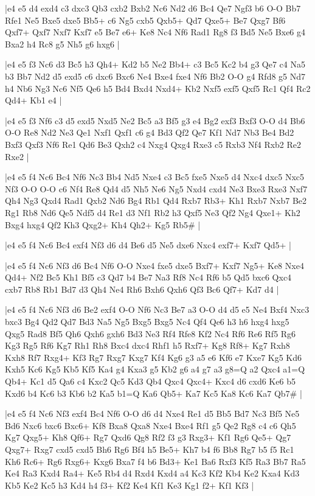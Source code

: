 \whitename{}
\blackname{}
\makegametitle
|e4 e5 d4 exd4 c3 dxc3 Qb3 cxb2 Bxb2 Nc6 Nd2 d6 Bc4 Qe7 Ngf3 b6 O-O Bb7 Rfe1 Ne5 Bxe5 dxe5 Bb5+ c6 Ng5 cxb5 Qxb5+ Qd7 Qxe5+ Be7 Qxg7 Bf6 Qxf7+ Qxf7 Nxf7 Kxf7 e5 Be7 e6+ Ke8 Nc4 Nf6 Rad1 Rg8 f3 Bd5 Ne5 Bxe6 g4 Bxa2 h4 Rc8 g5 Nh5 g6 hxg6  |

\whitename{}
\blackname{}
\makegametitle
|e4 e5 f3 Nc6 d3 Bc5 h3 Qh4+ Kd2 b5 Ne2 Bb4+ c3 Bc5 Kc2 b4 g3 Qe7 c4 Na5 b3 Bb7 Nd2 d5 exd5 c6 dxc6 Bxc6 Ne4 Bxe4 fxe4 Nf6 Bb2 O-O g4 Rfd8 g5 Nd7 h4 Nb6 Ng3 Nc6 Nf5 Qe6 h5 Bd4 Bxd4 Nxd4+ Kb2 Nxf5 exf5 Qxf5 Rc1 Qf4 Rc2 Qd4+ Kb1 e4  |

\whitename{}
\blackname{}
\makegametitle
|e4 e5 f3 Nf6 c3 d5 exd5 Nxd5 Ne2 Bc5 a3 Bf5 g3 e4 Bg2 exf3 Bxf3 O-O d4 Bb6 O-O Re8 Nd2 Ne3 Qe1 Nxf1 Qxf1 c6 g4 Bd3 Qf2 Qe7 Kf1 Nd7 Nb3 Be4 Bd2 Bxf3 Qxf3 Nf6 Re1 Qd6 Be3 Qxh2 c4 Nxg4 Qxg4 Rxe3 c5 Rxb3 Nf4 Rxb2 Re2 Rxe2  |

\whitename{}
\blackname{}
\makegametitle
|e4 e5 f4 Nc6 Bc4 Nf6 Nc3 Bb4 Nd5 Nxe4 c3 Bc5 fxe5 Nxe5 d4 Nxc4 dxc5 Nxc5 Nf3 O-O O-O c6 Nf4 Re8 Qd4 d5 Nh5 Ne6 Ng5 Nxd4 cxd4 Ne3 Bxe3 Rxe3 Nxf7 Qh4 Ng3 Qxd4 Rad1 Qxb2 Nd6 Bg4 Rb1 Qd4 Rxb7 Rb3+ Kh1 Rxb7 Nxb7 Be2 Rg1 Rb8 Nd6 Qe5 Ndf5 d4 Re1 d3 Nf1 Rb2 h3 Qxf5 Ne3 Qf2 Ng4 Qxe1+ Kh2 Bxg4 hxg4 Qf2 Kh3 Qxg2+ Kh4 Qh2+ Kg5 Rb5\#  |

\whitename{}
\blackname{}
\makegametitle
|e4 e5 f4 Nc6 Bc4 exf4 Nf3 d6 d4 Be6 d5 Ne5 dxe6 Nxc4 exf7+ Kxf7 Qd5+  |

\whitename{}
\blackname{}
\makegametitle
|e4 e5 f4 Nc6 Nf3 d6 Bc4 Nf6 O-O Nxe4 fxe5 dxe5 Bxf7+ Kxf7 Ng5+ Ke8 Nxe4 Qd4+ Nf2 Bc5 Kh1 Bf5 c3 Qd7 b4 Be7 Na3 Rf8 Nc4 Rf6 b5 Qd5 bxc6 Qxc4 cxb7 Rb8 Rb1 Bd7 d3 Qh4 Ne4 Rh6 Bxh6 Qxh6 Qf3 Bc6 Qf7+ Kd7 d4  |

\whitename{}
\blackname{}
\makegametitle
|e4 e5 f4 Nc6 Nf3 d6 Be2 exf4 O-O Nf6 Nc3 Be7 a3 O-O d4 d5 e5 Ne4 Bxf4 Nxc3 bxc3 Bg4 Qd2 Qd7 Bd3 Na5 Ng5 Bxg5 Bxg5 Nc4 Qf4 Qe6 h3 h6 hxg4 hxg5 Qxg5 Rad8 Bf5 Qh6 Qxh6 gxh6 Bd3 Ne3 Rf4 Rfe8 Kf2 Nc4 Rf6 Re6 Rf5 Rg6 Kg3 Rg5 Rf6 Kg7 Rh1 Rh8 Bxc4 dxc4 Rhf1 h5 Rxf7+ Kg8 Rf8+ Kg7 Rxh8 Kxh8 Rf7 Rxg4+ Kf3 Rg7 Rxg7 Kxg7 Kf4 Kg6 g3 a5 e6 Kf6 e7 Kxe7 Kg5 Kd6 Kxh5 Kc6 Kg5 Kb5 Kf5 Ka4 g4 Kxa3 g5 Kb2 g6 a4 g7 a3 g8=Q a2 Qxc4 a1=Q Qb4+ Kc1 d5 Qa6 c4 Kxc2 Qc5 Kd3 Qb4 Qxc4 Qxc4+ Kxc4 d6 cxd6 Ke6 b5 Kxd6 b4 Kc6 b3 Kb6 b2 Ka5 b1=Q Ka6 Qb5+ Ka7 Kc5 Ka8 Kc6 Ka7 Qb7\#  |

\whitename{}
\blackname{}
\makegametitle
|e4 e5 f4 Nc6 Nf3 exf4 Bc4 Nf6 O-O d6 d4 Nxe4 Re1 d5 Bb5 Bd7 Nc3 Bf5 Ne5 Bd6 Nxc6 bxc6 Bxc6+ Kf8 Bxa8 Qxa8 Nxe4 Bxe4 Rf1 g5 Qe2 Rg8 c4 c6 Qh5 Kg7 Qxg5+ Kh8 Qf6+ Rg7 Qxd6 Qg8 Rf2 f3 g3 Rxg3+ Kf1 Rg6 Qe5+ Qg7 Qxg7+ Rxg7 cxd5 cxd5 Bh6 Rg6 Bf4 h5 Be5+ Kh7 b4 f6 Bb8 Rg7 b5 f5 Rc1 Kh6 Rc6+ Rg6 Rxg6+ Kxg6 Bxa7 f4 b6 Bd3+ Ke1 Ba6 Rxf3 Kf5 Ra3 Bb7 Ra5 Ke4 Ra3 Kxd4 Ra4+ Ke5 Rb4 d4 Rxd4 Kxd4 a4 Kc3 Kf2 Kb4 Ke2 Kxa4 Kd3 Kb5 Ke2 Kc5 h3 Kd4 h4 f3+ Kf2 Ke4 Kf1 Ke3 Kg1 f2+ Kf1 Kf3  |

